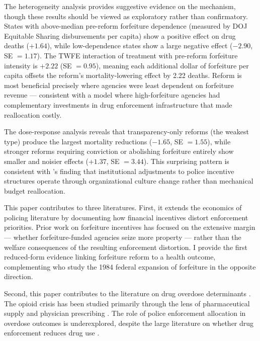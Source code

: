 \documentclass[12pt]{article}
\begin{document}
The heterogeneity analysis provides suggestive evidence on the mechanism, though these results should be viewed as exploratory rather than confirmatory. States with above-median pre-reform forfeiture dependence (measured by DOJ Equitable Sharing disbursements per capita) show a positive effect on drug deaths ($+1.64$), while low-dependence states show a large negative effect ($-2.90$, SE $= 1.17$). The TWFE interaction of treatment with pre-reform forfeiture intensity is $+2.22$ (SE $= 0.95$), meaning each additional dollar of forfeiture per capita offsets the reform's mortality-lowering effect by 2.22 deaths. Reform is most beneficial precisely where agencies were least dependent on forfeiture revenue --- consistent with a model where high-forfeiture agencies had complementary investments in drug enforcement infrastructure that made reallocation costly.

The dose-response analysis reveals that transparency-only reforms (the weakest type) produce the largest mortality reductions ($-1.65$, SE $= 1.55$), while stronger reforms requiring conviction or abolishing forfeiture entirely show smaller and noisier effects ($+1.37$, SE $= 3.44$). This surprising pattern is consistent with \citet{mello2019more}'s finding that institutional adjustments to police incentive structures operate through organizational culture change rather than mechanical budget reallocation.

This paper contributes to three literatures. First, it extends the economics of policing literature \citep{chalfin2022police, makowsky2019more, mello2019more} by documenting how financial incentives distort enforcement priorities. Prior work on forfeiture incentives has focused on the extensive margin --- whether forfeiture-funded agencies seize more property \citep{carpenter2020policing, holcomb2018civil, kelly2019economic} --- rather than the welfare consequences of the resulting enforcement distortion. I provide the first reduced-form evidence linking forfeiture reform to a health outcome, complementing \citet{kantor2021enforcement} who study the 1984 federal expansion of forfeiture in the opposite direction.

Second, this paper contributes to the literature on drug overdose determinants \citep{ruhm2019drivers, alpert2022origins, powell2020impact}. The opioid crisis has been studied primarily through the lens of pharmaceutical supply \citep{alpert2022origins} and physician prescribing \citep{buchmueller2020effect}. The role of police enforcement allocation in overdose outcomes is underexplored, despite the large literature on whether drug enforcement reduces drug use \citep{werb2011effectiveness, pollack2014punishing}.
\end{document}
